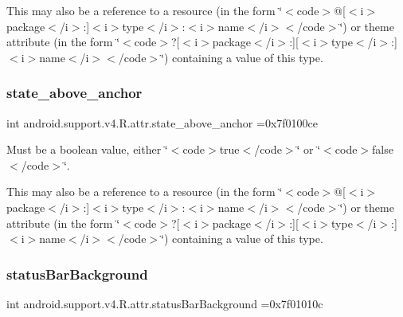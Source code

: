 This may also be a reference to a resource (in the form \char`\"{}$<$code$>$@\mbox{[}$<$i$>$package$<$/i$>$\+:\mbox{]}$<$i$>$type$<$/i$>$\+:$<$i$>$name$<$/i$>$$<$/code$>$\char`\"{}) or theme attribute (in the form \char`\"{}$<$code$>$?\mbox{[}$<$i$>$package$<$/i$>$\+:\mbox{]}\mbox{[}$<$i$>$type$<$/i$>$\+:\mbox{]}$<$i$>$name$<$/i$>$$<$/code$>$\char`\"{}) containing a value of this type. \mbox{\label{classandroid_1_1support_1_1v4_1_1R_1_1attr_aa2c47414936c3a0a1beddb34c7bd2fa5}} 
\subsubsection{\texorpdfstring{state\+\_\+above\+\_\+anchor}{state\_above\_anchor}}
{\footnotesize\ttfamily int android.\+support.\+v4.\+R.\+attr.\+state\+\_\+above\+\_\+anchor =0x7f0100ce\hspace{0.3cm}{\ttfamily [static]}}

Must be a boolean value, either \char`\"{}$<$code$>$true$<$/code$>$\char`\"{} or \char`\"{}$<$code$>$false$<$/code$>$\char`\"{}. 

This may also be a reference to a resource (in the form \char`\"{}$<$code$>$@\mbox{[}$<$i$>$package$<$/i$>$\+:\mbox{]}$<$i$>$type$<$/i$>$\+:$<$i$>$name$<$/i$>$$<$/code$>$\char`\"{}) or theme attribute (in the form \char`\"{}$<$code$>$?\mbox{[}$<$i$>$package$<$/i$>$\+:\mbox{]}\mbox{[}$<$i$>$type$<$/i$>$\+:\mbox{]}$<$i$>$name$<$/i$>$$<$/code$>$\char`\"{}) containing a value of this type. \mbox{\label{classandroid_1_1support_1_1v4_1_1R_1_1attr_a988668d48b62eb5d6612a421ffecbc58}} 
\subsubsection{\texorpdfstring{status\+Bar\+Background}{statusBarBackground}}
{\footnotesize\ttfamily int android.\+support.\+v4.\+R.\+attr.\+status\+Bar\+Background =0x7f01010c\hspace{0.3cm}{\ttfamily [static]}}

